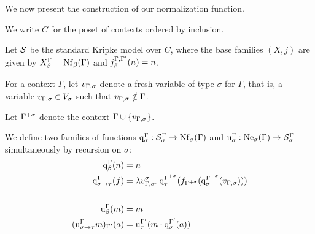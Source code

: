 We now present the construction of our normalization function.

\begin{defn}
We write $C$ for the poset of contexts ordered by inclusion.
\end{defn}

\begin{defn} \label{def:nbe-model}
Let $\struct{S}$ be the standard Kripke model over $C$, where the base families $(X, j)$ are given by $\kscomp{X}{\beta}{\Gamma} = \cNf{\Gamma}{\beta}$ and $\kscomp{j}{\beta}{\Gamma,\Gamma'}(n) = n$.
\end{defn}

\begin{notn} \label{not:fresh-vars}
\hfill \vspace{-6pt}
\begin{items}
\item For a context $\Gamma$, let $\fresh{\Gamma}{\sigma}$ denote a fresh variable of type $\sigma$ for $\Gamma$, that is, a variable $\fresh{\Gamma}{\sigma} \in \Var[\sigma]$ such that $\fresh{\Gamma}{\sigma} \notin \Gamma$.

\item Let $\extfresh{\Gamma}{\sigma}$ denote the context $\Gamma \cup \singset[\fresh{\Gamma}{\sigma}]$.
\end{items}
\end{notn}

\begin{defn} \label{def:quote-unquote}
We define two families of functions $\quotef{\Gamma}{\sigma} : \kscomp{\struct{S}}{\sigma}{\Gamma} \to \cNf{\Gamma}{\sigma}$ and $\unquotef{\Gamma}{\sigma} : \cNe{\Gamma}{\sigma} \to \kscomp{\struct{S}}{\sigma}{\Gamma}$ simultaneously by recursion on $\sigma$:
\begin{align*}
\quotef{\Gamma}{\beta}(n) &= n \\
\quotef{\Gamma}{\functy{\sigma}{\tau}}(f) &= \lamv{\fresh{\Gamma}{\sigma}}{\sigma}{\quotef{\extfresh{\Gamma}{\sigma}}{\tau}(f_{\extfresh{\Gamma}{\sigma}}(\quotef{\extfresh{\Gamma}{\sigma}}{\sigma}(\fresh{\Gamma}{\sigma})))} \\
\\
\unquotef{\Gamma}{\beta}(m) &= m \\
(\unquotef{\Gamma}{\functy{\sigma}{\tau}}{m})_{\Gamma'}(a)
    &= \unquotef{\Gamma'}{\tau}(\app{m}{\quotef{\Gamma'}{\sigma}(a)})
\end{align*}
\end{defn}


